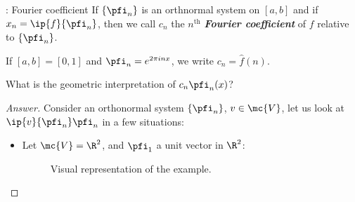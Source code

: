 \begin{ndef}{: Fourier coefficient}
    If \(\{\pfi_n\}\) is an orthnormal system on \([a,b]\) and if \(x_n=\ip{f}{\pfi_n}\), then we call \(c_n\) the \(n^{\text{th}}\) \emph{\textbf{Fourier coefficient}} of \(f\) relative to \(\{\pfi_n\}\).

    \medskip

    If \([a,b]=[0,1]\) and \(\pfi_n=e^{2\pi i nx}\), we write \(c_n=\hat{f}(n)\). 
\end{ndef}
\begin{fft}
    What is the geometric interpretation of \(c_n\pfi_n(x)\)?
\end{fft}
\begin{proof}[Answer]\let\qed\relax
    Consider an orthonormal system \(\{\pfi_n\}\), \(v\in\mc{V}\), let us look at \(\ip{v}{\pfi_n}\pfi_n\) in a few situations:
    \begin{itemize}
        \item  Let \(\mc{V}=\R^2\), and \(\pfi_1\) a unit vector in \(\R^2\):
        
        \begin{figure}[H]
            \centering
            \caption{Visual representation of the example.}
        \end{figure}


\end{itemize}
\end{proof}
